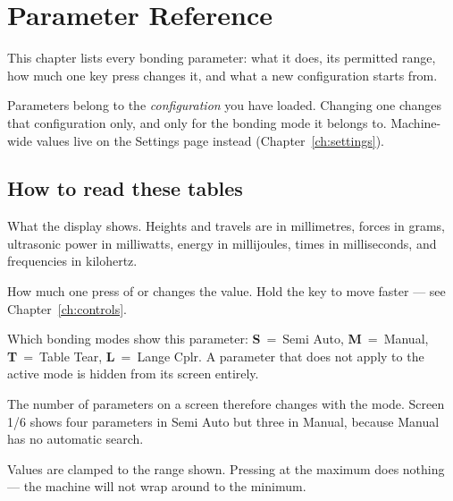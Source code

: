 \chapter{Parameter Reference}
\label{ch:parameters}

This chapter lists every bonding parameter: what it does, its permitted range,
how much one key press changes it, and what a new configuration starts from.

Parameters belong to the \emph{configuration} you have loaded. Changing one
changes that configuration only, and only for the bonding mode it belongs to.
Machine-wide values live on the Settings page instead (Chapter~\ref{ch:settings}).

\section{How to read these tables}

\begin{description}[leftmargin=!,labelwidth=22mm,style=nextline]
\item[Unit] What the display shows. Heights and travels are in millimetres,
  forces in grams, ultrasonic power in milliwatts, energy in millijoules, times
  in milliseconds, and frequencies in kilohertz.
\item[Step] How much one press of \keycap{$+$} or \keycap{$-$} changes the
  value. Hold the key to move faster --- see Chapter~\ref{ch:controls}.
\item[Modes] Which bonding modes show this parameter:
  \textbf{S}~=~Semi Auto, \textbf{M}~=~Manual, \textbf{T}~=~Table Tear,
  \textbf{L}~=~Lange Cplr. A parameter that does not apply to the active mode
  is hidden from its screen entirely.
\end{description}

The number of parameters on a screen therefore changes with the mode. Screen
1/6 shows four parameters in Semi Auto but three in Manual, because Manual has
no automatic search.

\begin{wbnote}
Values are clamped to the range shown. Pressing \keycap{$+$} at the maximum
does nothing --- the machine will not wrap around to the minimum.
\end{wbnote}


